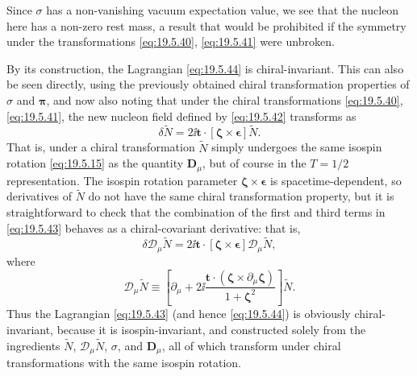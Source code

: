 Since $\sigma$ has a non-vanishing vacuum expectation value, we see that the nucleon here has a non-zero rest mass, a result that would be prohibited if the symmetry under the transformations \eqref{eq:19.5.40}, \eqref{eq:19.5.41} were unbroken.

By its construction, the Lagrangian \eqref{eq:19.5.44} is chiral-invariant. This can also be seen directly, using the previously obtained chiral transformation properties of $\sigma$ and $\boldsymbol{\pi}$, and now also noting that under the chiral transformations \eqref{eq:19.5.40}, \eqref{eq:19.5.41}, the new nucleon field defined by \eqref{eq:19.5.42} transforms as
\begin{equation}
\delta\widetilde N
=2\ii\boldsymbol t\cdot
[\boldsymbol{\zeta}\times\boldsymbol{\epsilon}]
\widetilde N.
\tag{19.5.45}\label{eq:19.5.45}
\end{equation}
That is, under a chiral transformation $\widetilde N$ simply undergoes the same isospin rotation \eqref{eq:19.5.15} as the quantity $\boldsymbol D_\mu$, but of course in the $T=1/2$ representation. The isospin rotation parameter $\boldsymbol{\zeta}\times\boldsymbol{\epsilon}$ is spacetime-dependent, so derivatives of $\widetilde N$ do not have the same chiral transformation property, but it is straightforward to check that the combination of the first and third terms in \eqref{eq:19.5.43} behaves as a chiral-covariant derivative: that is,
\begin{equation}
\delta\mathcal D_\mu\widetilde N
=2\ii\boldsymbol t\cdot
[\boldsymbol{\zeta}\times\boldsymbol{\epsilon}]
\mathcal D_\mu\widetilde N,
\tag{19.5.46}\label{eq:19.5.46}
\end{equation}
where
\begin{equation}
\mathcal D_\mu\widetilde N
\equiv
\left[
\partial_\mu
+2\ii\frac{\boldsymbol t\cdot
(\boldsymbol{\zeta}\times\partial_\mu\boldsymbol{\zeta})}
{1+\boldsymbol{\zeta}^2}
\right]\widetilde N.
\tag{19.5.47}\label{eq:19.5.47}
\end{equation}
Thus the Lagrangian \eqref{eq:19.5.43} (and hence \eqref{eq:19.5.44}) is obviously chiral-invariant, because it is isospin-invariant, and constructed solely from the ingredients $\widetilde N$, $\mathcal D_\mu\widetilde N$, $\sigma$, and $\boldsymbol D_\mu$, all of which transform under chiral transformations with the same isospin rotation.

